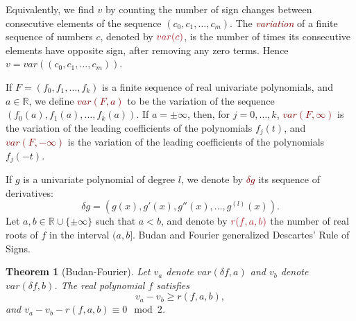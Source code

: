 \documentclass[12pt]{amsart}
\newtheorem{theorem}{Theorem}
\newtheorem{corollary}[theorem]{Corollary}
\theoremstyle{definition}
\newcommand{\RR}{\mathbb{R}}
\begin{document}



Equivalently, we find $v$ by counting the number of sign changes between consecutive elements of the sequence $(c_{0},c_{1},\dots,c_{m})$. The \textit{\textcolor{Maroon}{variation}} of a finite sequence of numbers $c$, denoted by $\textcolor{Maroon}{var(c)}$, is the number of times its consecutive elements have opposite sign, after removing any zero terms. Hence $v = var\left((c_{0},c_{1},\dots,c_{m})\right)$.

If $F=(f_{0},f_{1},\dots,f_{k})$ is a finite sequence of real univariate polynomials, and $a\in \RR$, we define \textcolor{Maroon}{$var(F,a)$} to be the variation of the sequence $(f_{0}(a),f_{1}(a),\dots,f_{k}(a))$. If $a=\pm\infty$, then, for $j=0,\dots, k$, \textcolor{Maroon}{$var(F,\infty)$} is the variation of the leading coefficients of the polynomials $f_{j}(t)$, and \textcolor{Maroon}{$var(F,-\infty)$} is the variation of the leading coefficients of the polynomials $f_{j}(-t)$.

If $g$ is a univariate polynomial of degree $l$, we denote by \textcolor{Maroon}{$\delta g$} its sequence of derivatives: $$\delta g = \left(g(x),g'(x),g''(x),\dots,g^{(l)}(x)\right).$$ Let $a,b\in \RR\cup\{\pm \infty\}$ such that $a<b$, and denote by $\textcolor{Maroon}{r(f,a,b)}$ the number of real roots of $f$ in the interval $(a,b]$. Budan and Fourier \cite{MR2830310} generalized Descartes' Rule of Signs.

\begin{theorem}[Budan-Fourier] Let $v_{a}$ denote $var(\delta f,a)$ and $v_{b}$ denote $var(\delta f,b)$. The real polynomial $f$ satisfies $$v_{a} - v_{b} \geq r(f,a,b),$$ and $v_{a} - v_{b} - r(f,a,b) \equiv 0 \mod 2$.\end{theorem}
\end{document}
